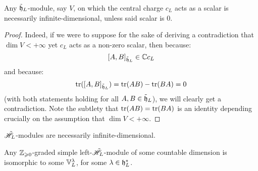         \begin{lemma}
            Any $\tilde{\mathfrak{h}}_L$-module, say $V$, on which the central charge $c_L$ acts as a scalar is necessarily infinite-dimensional, unless said scalar is $0$.
        \end{lemma}
            \begin{proof}
                Indeed, if we were to suppose for the sake of deriving a contradiction that $\dim V < +\infty$ yet $c_L$ acts as a non-zero scalar, then because:
                    $$[A, B]_{\tilde{\mathfrak{h}}_L} \in \mathbb{C} c_L$$
                and because:
                    $$\operatorname{tr}([A, B]_{\tilde{\mathfrak{h}}_L}) = \operatorname{tr}(AB) - \operatorname{tr}(BA) = 0$$
                (with both statements holding for all $A, B \in \tilde{\mathfrak{h}}_L$), we will clearly get a contradiction. Note the subtlety that $\operatorname{tr}(AB) = \operatorname{tr}(BA)$ is an identity depending crucially on the assumption that $\dim V < +\infty$.
            \end{proof}
        \begin{corollary}
            $\tilde{\mathscr{H}}_L$-modules are necessarily infinite-dimensional. 
        \end{corollary}
        \begin{proposition} \label{prop: simple_lattice_weyl_modules_are_vacuum_modules}
            Any $\mathbb{Z}_{\geqslant 0}$-graded simple left-$\tilde{\mathscr{H}}_L$-module of some countable dimension is isomorphic to some $\mathbb{V}_L^{\lambda}$, for some $\lambda \in \mathfrak{h}_L^*$.
        \end{proposition}
